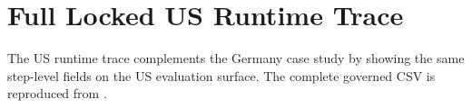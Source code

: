 \chapter{Full Locked US Runtime Trace}
\label{app:full-us-trace}

The US runtime trace complements the Germany case study by showing the same
step-level fields on the US evaluation surface. The complete governed CSV is
reproduced from .


